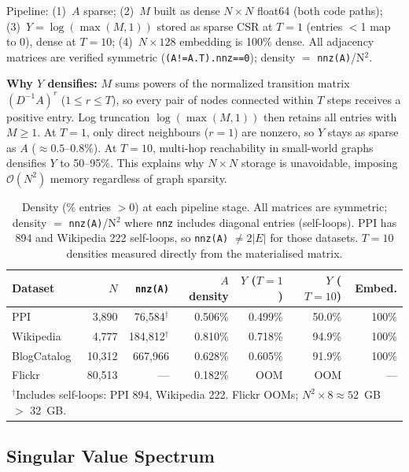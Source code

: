 \documentclass[10pt,letterpaper]{article}
\begin{document}
Pipeline: (1)~$A$ sparse; (2)~$M$ built as dense $N{\times}N$ float64 (both code paths);
(3)~$Y=\log(\max(M,1))$ stored as sparse CSR at $T{=}1$ (entries $<$1 map to 0), dense at $T{=}10$;
(4)~$N{\times}128$ embedding is 100\% dense. All adjacency matrices are verified symmetric
(\texttt{(A!=A.T).nnz==0}); density $=$ \texttt{nnz(A)}/N$^2$.

\textbf{Why $Y$ densifies:} $M$ sums powers of the normalized transition matrix $(D^{-1}A)^r$ ($1 \le r \le T$), so every pair of nodes connected within $T$ steps receives a positive entry.
Log truncation $\log(\max(M,1))$ then retains all entries with $M \ge 1$.
At $T{=}1$, only direct neighbours ($r=1$) are nonzero, so $Y$ stays as sparse as $A$ (${\approx}0.5$--$0.8\%$).
At $T{=}10$, multi-hop reachability in small-world graphs densifies $Y$ to 50--95\%.
This explains why $N{\times}N$ storage is unavoidable, imposing $\mathcal{O}(N^2)$ memory regardless of graph sparsity.

\begin{table}[h]
\centering\vspace{-4pt}
\caption{Density (\% entries $>0$) at each pipeline stage. All matrices are symmetric;
density $=$ \texttt{nnz(A)}/N$^2$ where \texttt{nnz} includes diagonal entries (self-loops).
PPI has 894 and Wikipedia 222 self-loops, so \texttt{nnz(A)} $\neq 2|E|$ for those datasets.
$T{=}10$ densities measured directly from the materialised matrix.}
\label{tab:sparsity}
\small
\begin{tabular}{lrrrrrr}
\toprule
\textbf{Dataset} & $N$ & \texttt{nnz(A)} & \textbf{$A$ density} & \textbf{$Y$ ($T{=}1$)} & \textbf{$Y$ ($T{=}10$)} & \textbf{Embed.} \\
\midrule
PPI         &  3,890 &  76,584$^\dagger$ & 0.506\% & 0.499\% & 50.0\% & 100\% \\
Wikipedia   &  4,777 & 184,812$^\dagger$ & 0.810\% & 0.718\% & 94.9\% & 100\% \\
BlogCatalog & 10,312 & 667,966           & 0.628\% & 0.605\% & 91.9\% & 100\% \\
Flickr      & 80,513 & ---               & 0.182\% & OOM & OOM & --- \\
\bottomrule
\multicolumn{7}{l}{\small $^\dagger$Includes self-loops: PPI 894, Wikipedia 222. Flickr OOMs; $N^2{\times}8\approx52$~GB $>$ 32~GB.}
\end{tabular}
\end{table}

\subsection*{Singular Value Spectrum}
\end{document}
